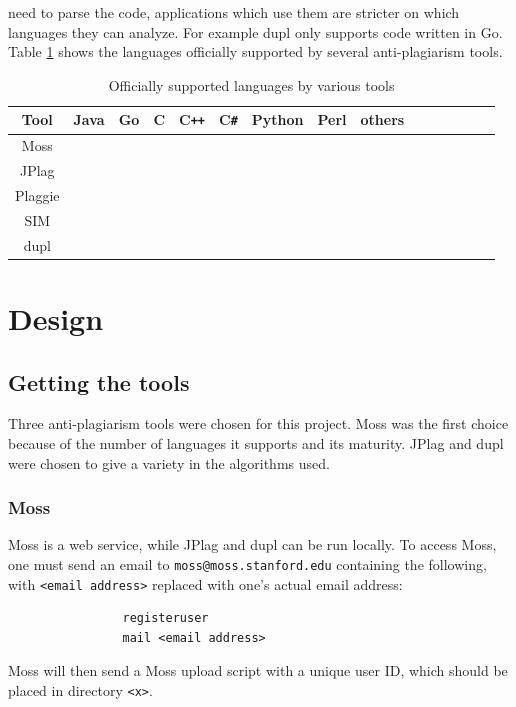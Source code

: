 \documentclass[12pt]{article}
\begin{document}
need to parse the code, applications which use them are stricter on which languages they can analyze. For example dupl only supports code written in Go. Table \ref{tab:languageSupport} shows the languages officially supported by several anti-plagiarism tools.
		
			\begin{table}[h!]
				\begin{center}
					\caption{Officially supported languages by various tools}
					\label{tab:languageSupport}
					\begin{tabular}{ccccccccccccccc}
						\toprule
						Tool & Java & Go & C & C\verb!++! & C\verb!#! & Python & Perl & others\\
						\midrule
						Moss & \checkmark & & \checkmark & \checkmark & \checkmark & \checkmark & \checkmark & \checkmark \\
						JPlag & \checkmark & & \checkmark & \checkmark & \checkmark & & & \checkmark\\
						Plaggie & \checkmark & & & & & & & \\
						SIM & \checkmark & & \checkmark & & & & & \checkmark\\
						dupl & & \checkmark & & & & & & \\
						\bottomrule
					\end{tabular}
				\end{center}
			\end{table}
		
	\section{Design}
		\subsection{Getting the tools}
			Three anti-plagiarism tools were chosen for this project. Moss was the first choice because of the number of languages it supports and its maturity. JPlag and dupl were chosen to give a variety in the algorithms used.
			
			\subsubsection{Moss}
			Moss is a web service, while JPlag and dupl can be run locally. To access Moss, one must send an email to \verb|moss@moss.stanford.edu| containing the following, with \verb|<email address>| replaced with one's actual email address:
			\begin{verbatim}
				registeruser
				mail <email address>
			\end{verbatim}
			\noindent Moss will then send a Moss upload script with a unique user ID, which should be placed in directory \verb|<x>|.
			
\end{document}
